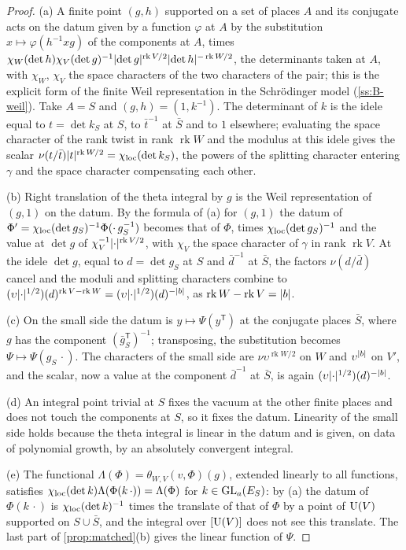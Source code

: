 \begin{proof}
(a) A finite point $(g,h)$ supported on a set of places $A$ and its conjugate acts on the datum given by a function $\varphi$ at $A$ by the substitution $x\mapsto\varphi(h^{-1}xg)$ of the components at $A$,
times $\chi_W(\det h)\chi_V(\det g)^{-1}\lvert \det g\rvert^{\operatorname{rk}V/2}\lvert \det h\rvert^{-\operatorname{rk}W/2}$, the determinants taken at $A$, with $\chi_W$, $\chi_V$ the space characters of the two characters of
the pair; this is the explicit form of the finite Weil representation in the Schr\"odinger model (\cref{ss:B-weil}). Take $A=S$ and $(g,h)=(1,k^{-1})$. The determinant of $k$ is the idele equal to
$t=\det k_S$ at $S$, to $\bar t^{-1}$ at $\bar S$ and to $1$ elsewhere; evaluating the space character of the rank twist in rank $\operatorname{rk}W$ and the modulus at this idele gives the scalar
$\nu(t/\bar t)\lvert t\rvert^{\operatorname{rk}W/2}=\chi_{\rm loc}(\det k_S)$, the powers of the splitting character entering $\gamma$ and the space character compensating each other.

(b) Right translation of the theta integral by $g$ is the Weil representation of $(g,1)$ on the datum. By the formula of (a) for $(g,1)$ the datum of $\Phi'=\chi_{\rm loc}(\det g_S)^{-1}\Phi(\cdot\,g_S^{-1})$
becomes that of $\Phi$, times $\chi_{\rm loc}(\det g_S)^{-1}$ and the value at $\det g$ of $\chi_V^{-1}\lvert \cdot\rvert^{\operatorname{rk}V/2}$, with $\chi_V$ the space character of $\gamma$ in rank $\operatorname{rk}V$. At the idele
$\det g$, equal to $d=\det g_S$ at $S$ and $\bar d^{-1}$ at $\bar S$, the factors $\nu(d/\bar d)$ cancel and the moduli and splitting characters combine to
$(\upsilon\lvert \cdot\rvert^{1/2})(d)^{\operatorname{rk}V-\operatorname{rk}W}=(\upsilon\lvert \cdot\rvert^{1/2})(d)^{-\lvert b\rvert}$, as $\operatorname{rk}W-\operatorname{rk}V=\lvert b\rvert$.

(c) On the small side the datum is $y\mapsto\Psi(y^{\mathsf T})$ at the conjugate places $\bar S$, where $g$ has the component $(\bar g_S^{\mathsf T})^{-1}$; transposing, the substitution becomes
$\Psi\mapsto\Psi(g_S\,\cdot)$. The characters of the small side are $\nu\upsilon^{\operatorname{rk}W/2}$ on $W$ and $\upsilon^{\lvert b\rvert}$ on $V'$, and the scalar, now a value at the component $\bar d^{-1}$ at $\bar S$,
is again $(\upsilon\lvert \cdot\rvert^{1/2})(d)^{-\lvert b\rvert}$.

(d) An integral point trivial at $S$ fixes the vacuum at the other finite places and does not touch the components at $S$, so it fixes the datum. Linearity of the small side holds because the
theta integral is linear in the datum and is given, on data of polynomial growth, by an absolutely convergent integral.

(e) The functional $\Lambda(\Phi)=\theta_{W,V}(v,\Phi)(g)$, extended linearly to all functions, satisfies $\chi_{\rm loc}(\det k)\Lambda(\Phi(k\,\cdot))=\Lambda(\Phi)$ for $k\in\operatorname{GL}_a(E_S)$: by (a) the datum of
$\Phi(k\,\cdot)$ is $\chi_{\rm loc}(\det k)^{-1}$ times the translate of that of $\Phi$ by a point of $\operatorname{U}(V)$ supported on $S\cup\bar S$, and the integral over $[\operatorname{U}(V)]$ does not see this translate. The last
part of \cref{prop:matched}(b) gives the linear function of $\Psi$.
\end{proof}

